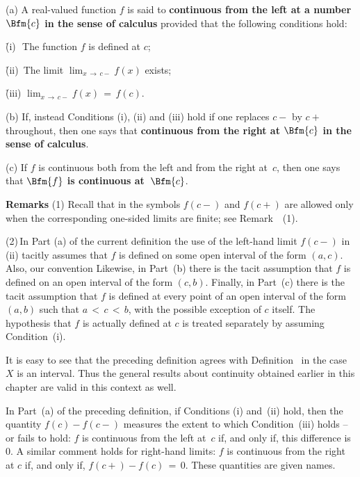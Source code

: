 \V

\hspace*{\parindent}(a) A real-valued function $f$ is said to {\bf continuous from the left at a number $\Bfm{c}$ in the sense of calculus}
     provided that the following conditions hold:

\VA

        \h (i)\,\, The function $f$ is defined at $c$;

        \h (ii)\, The limit $\lim_{x \,{\rightarrow}\, c-} f(x)$ exists;

        \h (iii) $\lim_{x \,{\rightarrow}\, c-} f(x) \,=\, f(c)$.

\VA

        (b) If, instead Conditions (i), (ii) and (iii) hold if one replaces $c-$ by $c+$ throughout,
    then one says that {\bf continuous from the right at $\Bfm{c}$ in the sense of calculus}.

\V

        (c) If $f$ is continuous both from the left and from the right at~$c$, then one says that {\bf $\Bfm{f}$ is continuous at~$\Bfm{c}$}.

\V

        {\bf Remarks} (1) Recall that in {\ThisText} the symbols $f(c-)$ and $f(c+)$ are allowed only when the corresponding one-sided limits are finite;
    see Remark~~(1).

\V

        (2)\,In Part (a) of the current definition the use of the left-hand limit $f(c-)$ in (ii)
    tacitly assumes that $f$ is defined on some open interval of the form $(a,c)$. Also, our convention
    Likewise, in Part~(b) there is the tacit assumption that $f$ is defined on an open interval of the form $(c,b)$.
    Finally, in Part~(c) there is the tacit assumption that $f$ is defined at every point of an open interval of the form $(a,b)$ such that $a\,<\,c\,<\,b$,
    with the possible exception of $c$ itself. The hypothesis that $f$ is actually defined at $c$ is treated separately by assuming Condition~(i).

\VV

        It is easy to see that the preceding definition agrees with Definition~ in the case $X$ is an interval.
    Thus the general results about continuity obtained earlier in this chapter are valid in this context as well.

\VV

        In Part~(a) of the preceding definition, if Conditions (i) and~(ii) hold,
    then the quantity $f(c) - f(c-)$ measures the extent to which Condition~(iii) holds -- or fails to hold:
    $f$ is continuous from the left at~$c$ if, and only if, this difference is~$0$.
    A similar comment holds for right-hand limits: $f$ is continuous from the right at $c$ if, and only if, $f(c+)-f(c) \,=\, 0$.
    These quantities are given names.


